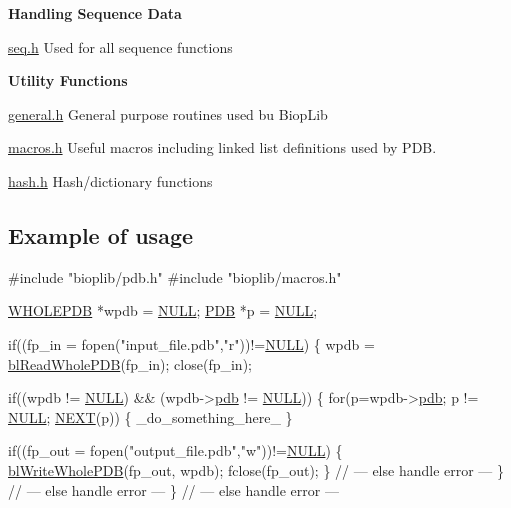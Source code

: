 {\bfseries Handling Sequence Data}
\begin{DoxyItemize}
\item \hyperlink{seq_8h}{seq.\-h} Used for all sequence functions
\end{DoxyItemize}

{\bfseries Utility Functions}
\begin{DoxyItemize}
\item \hyperlink{general_8h}{general.\-h} General purpose routines used bu Biop\-Lib
\item \hyperlink{macros_8h}{macros.\-h} Useful macros including linked list definitions used by P\-D\-B.
\item \hyperlink{hash_8h}{hash.\-h} Hash/dictionary functions
\end{DoxyItemize}

\subsection*{Example of usage }


\begin{DoxyCode}
\textcolor{preprocessor}{#include "bioplib/pdb.h"}
\textcolor{preprocessor}{#include "bioplib/macros.h"}

\hyperlink{struct__wholepdb}{WHOLEPDB} *wpdb = \hyperlink{array2_8c_a070d2ce7b6bb7e5c05602aa8c308d0c4}{NULL};
\hyperlink{structpdb__entry}{PDB}      *p    = \hyperlink{array2_8c_a070d2ce7b6bb7e5c05602aa8c308d0c4}{NULL};

\textcolor{keywordflow}{if}((fp\_in = fopen(\textcolor{stringliteral}{"input\_file.pdb"},\textcolor{stringliteral}{"r"}))!=\hyperlink{array2_8c_a070d2ce7b6bb7e5c05602aa8c308d0c4}{NULL})
\{
   wpdb = \hyperlink{pdb_8h_aac630c13aff6802b905c10ce97d64761}{blReadWholePDB}(fp\_in);
   close(fp\_in);

   \textcolor{keywordflow}{if}((wpdb != \hyperlink{array2_8c_a070d2ce7b6bb7e5c05602aa8c308d0c4}{NULL}) && (wpdb->\hyperlink{struct__wholepdb_a9cac171f884f9ad8fd8dbb4d36b233a0}{pdb} != \hyperlink{array2_8c_a070d2ce7b6bb7e5c05602aa8c308d0c4}{NULL}))
   \{
      \textcolor{keywordflow}{for}(p=wpdb->\hyperlink{struct__wholepdb_a9cac171f884f9ad8fd8dbb4d36b233a0}{pdb}; p != \hyperlink{array2_8c_a070d2ce7b6bb7e5c05602aa8c308d0c4}{NULL}; \hyperlink{macros_8h_a184eb1eeb21deade2e180823b4a0e04c}{NEXT}(p))
      \{
         \_do\_something\_here\_ 
      \}

      \textcolor{keywordflow}{if}((fp\_out = fopen(\textcolor{stringliteral}{"output\_file.pdb"},\textcolor{stringliteral}{"w"}))!=\hyperlink{array2_8c_a070d2ce7b6bb7e5c05602aa8c308d0c4}{NULL})
      \{
         \hyperlink{pdb_8h_a41023286849e00cae2fbe0a6c89118f2}{blWriteWholePDB}(fp\_out, wpdb);
         fclose(fp\_out);
      \}
      \textcolor{comment}{// --- else handle error --- }
   \}
   \textcolor{comment}{// --- else handle error ---}
\}
\textcolor{comment}{// --- else handle error ---}
\end{DoxyCode}
 